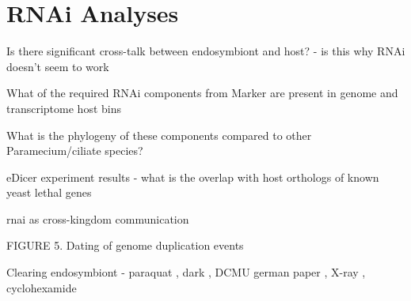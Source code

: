 \graphicspath{{chapters/7.Chapter_5/figures}}

\chapter{RNAi Analyses}

Is there significant cross-talk between endosymbiont and host? - is this why RNAi doesn't seem to work

What of the required RNAi components from Marker are present in genome and transcriptome host bins

What is the phylogeny of these components compared to other Paramecium/ciliate species?

eDicer experiment results - what is the overlap with host orthologs of known yeast lethal genes

rnai as cross-kingdom communication \citep{Weiberg2015}



FIGURE 5. Dating of genome duplication events







Clearing endosymbiont - paraquat \citep{Hosoya1995a}, dark \citep{Karakashian1963}, DCMU german paper \citep{Reisser1976},
X-ray \citep{Wichterman1948}, cyclohexamide \citep{Weis1984,Kodama2007}



